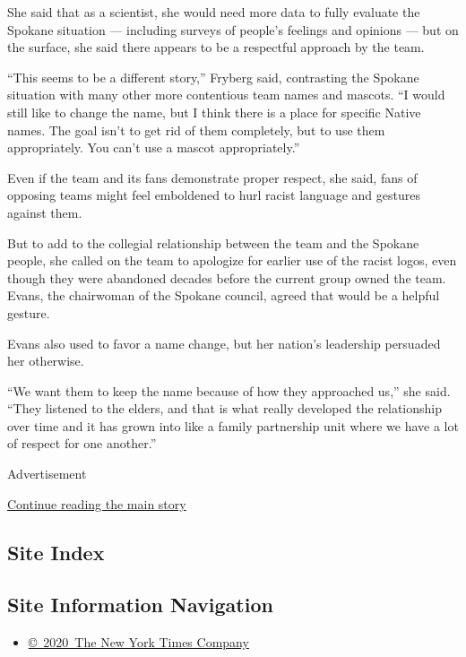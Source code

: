 She said that as a scientist, she would need more data to fully evaluate
the Spokane situation --- including surveys of people's feelings and
opinions --- but on the surface, she said there appears to be a
respectful approach by the team.

``This seems to be a different story,'' Fryberg said, contrasting the
Spokane situation with many other more contentious team names and
mascots. ``I would still like to change the name, but I think there is a
place for specific Native names. The goal isn't to get rid of them
completely, but to use them appropriately. You can't use a mascot
appropriately.''

Even if the team and its fans demonstrate proper respect, she said, fans
of opposing teams might feel emboldened to hurl racist language and
gestures against them.

But to add to the collegial relationship between the team and the
Spokane people, she called on the team to apologize for earlier use of
the racist logos, even though they were abandoned decades before the
current group owned the team. Evans, the chairwoman of the Spokane
council, agreed that would be a helpful gesture.

Evans also used to favor a name change, but her nation's leadership
persuaded her otherwise.

``We want them to keep the name because of how they approached us,'' she
said. ``They listened to the elders, and that is what really developed
the relationship over time and it has grown into like a family
partnership unit where we have a lot of respect for one another.''

Advertisement

\protect\hyperlink{after-bottom}{Continue reading the main story}

\hypertarget{site-index}{%
\subsection{Site Index}\label{site-index}}

\hypertarget{site-information-navigation}{%
\subsection{Site Information
Navigation}\label{site-information-navigation}}

\begin{itemize}
\tightlist
\item
  \href{https://help.nytimes.com/hc/en-us/articles/115014792127-Copyright-notice}{©~2020~The
  New York Times Company}
\end{itemize}

